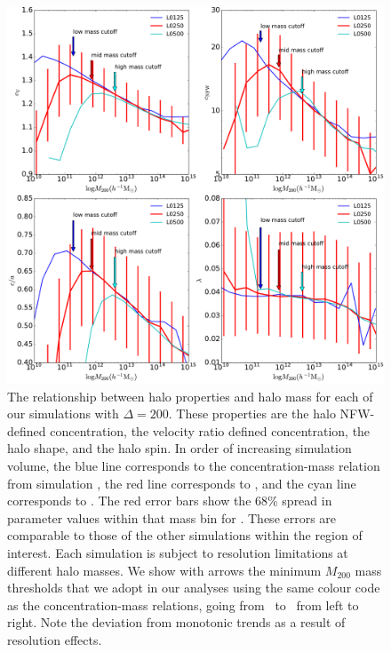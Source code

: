 \documentclass[usenatbib,fleqn]{mnras}
\begin{document}
\begin{figure}
\centering
\includegraphics[width=\textwidth]{masscuts_d200.pdf}
\caption{
The relationship between halo properties and halo mass for each of our simulations with $\Delta =200$. These properties are the halo NFW-defined concentration, the velocity ratio defined concentration, the halo shape, and the halo spin. In order of increasing simulation volume, the blue line corresponds to the concentration-mass relation from simulation \simA, the red line corresponds to \simB, and the cyan line corresponds to \simC. The red error bars show the 68\% spread in parameter values within that mass bin for \simB. These errors are comparable to those of the other simulations within the region of interest. Each simulation is subject to resolution limitations at different halo masses. We show with arrows the minimum $M_{200}$ mass thresholds that we adopt in our analyses using the same colour code as the concentration-mass relations, going from \simA \ to \simC \ from left to right. Note the deviation from monotonic trends as a result of resolution effects.
}
\label{fig:massrelation}
\end{figure}
\end{document}
